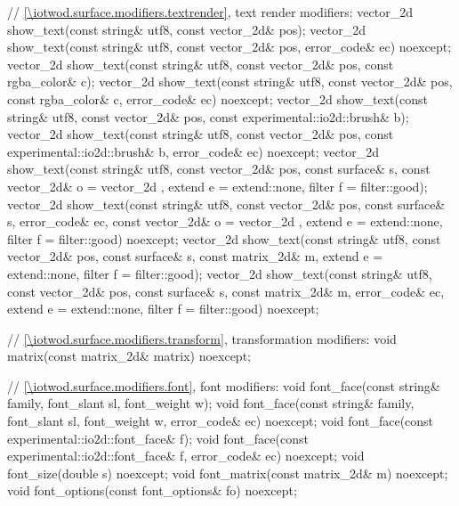 \begin{codeblock}
{{{{{    // \ref{\iotwod.surface.modifiers.textrender}, text render modifiers:
    vector_2d show_text(const string& utf8, const vector_2d& pos);
    vector_2d show_text(const string& utf8, const vector_2d& pos,
      error_code& ec) noexcept;
    vector_2d show_text(const string& utf8, const vector_2d& pos,
      const rgba_color& c);
    vector_2d show_text(const string& utf8, const vector_2d& pos,
      const rgba_color& c, error_code& ec) noexcept;
    vector_2d show_text(const string& utf8, const vector_2d& pos,
      const experimental::io2d::brush& b);
    vector_2d show_text(const string& utf8, const vector_2d& pos,
      const experimental::io2d::brush& b, error_code& ec) noexcept;
    vector_2d show_text(const string& utf8, const vector_2d& pos,
      const surface& s, const vector_2d& o = vector_2d{ },
      extend e = extend::none, filter f = filter::good);
    vector_2d show_text(const string& utf8, const vector_2d& pos,
      const surface& s, error_code& ec, const vector_2d& o = vector_2d{ },
      extend e = extend::none, filter f = filter::good) noexcept;
    vector_2d show_text(const string& utf8, const vector_2d& pos,
      const surface& s, const matrix_2d& m, extend e = extend::none,
      filter f = filter::good);
    vector_2d show_text(const string& utf8, const vector_2d& pos,
      const surface& s, const matrix_2d& m, error_code& ec,
      extend e = extend::none, filter f = filter::good) noexcept;
    
    // \ref{\iotwod.surface.modifiers.transform}, transformation modifiers:
    void matrix(const matrix_2d& matrix) noexcept;
    
    // \ref{\iotwod.surface.modifiers.font}, font modifiers:
    void font_face(const string& family, font_slant sl, font_weight w);
    void font_face(const string& family, font_slant sl, font_weight w,
      error_code& ec) noexcept;
    void font_face(const experimental::io2d::font_face& f);
    void font_face(const experimental::io2d::font_face& f, error_code& ec)
      noexcept;
    void font_size(double s) noexcept;
    void font_matrix(const matrix_2d& m) noexcept;
    void font_options(const font_options& fo) noexcept;
    
}}}}}
\end{codeblock}
